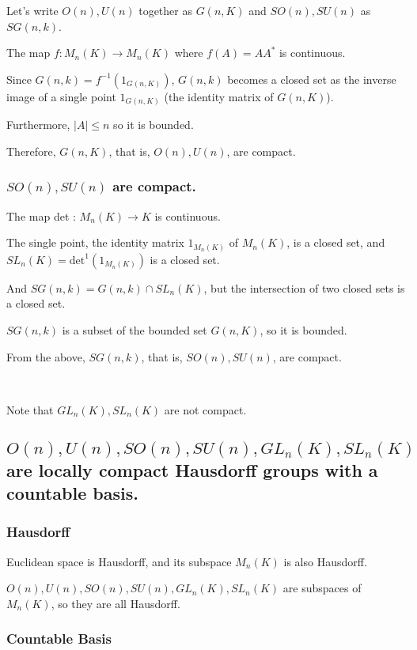 \documentclass[uplatex,a4j,12pt,dvipdfmx]{jsarticle}
\begin{document}
Let's write $O(n),U(n)$ together as $G(n,K)$ and $SO(n),SU(n)$ as $SG(n,k)$.

The map $f: M_{n}(K) \to M_{n}(K)$ where $f(A) = A A^{*}$ is continuous.

Since $G(n,k) = f^{-1}(1_{G(n,K)})$, $G(n,k)$ becomes a closed set as the inverse image of a single point $1_{G(n,K)}$ (the identity matrix of $G(n,K)$).

Furthermore, $|A| \leq n$ so it is bounded.

Therefore, $G(n,K)$, that is, $O(n),U(n)$, are compact.


\subsubsection{\textbf{$SO(n),SU(n)$ are compact.}}

The map det : $M_{n}(K) \to K$ is continuous.

The single point, the identity matrix $1_{M_{n}(K)}$ of $M_{n}(K)$, is a closed set, and
$SL_{n}(K) = \text{det}^{1}(1_{M_{n}(K)})$ is a closed set.

And $SG(n,k) = G(n,k) \cap SL_{n}(K)$, but the intersection of two closed sets is a closed set.

$SG(n,k)$ is a subset of the bounded set $G(n,K)$, so it is bounded.

From the above, $SG(n,k)$, that is, $SO(n),SU(n)$, are compact.

\ \ 

Note that $GL_{n}(K), SL_{n}(K)$ are not compact.


\subsection{\textbf{$O(n),U(n),SO(n),SU(n),GL_{n}(K),SL_{n}(K)$ are locally compact Hausdorff groups with a countable basis.}}

\subsubsection{\textbf{Hausdorff}}

Euclidean space is Hausdorff, and its subspace $M_{n}(K)$ is also Hausdorff.

$O(n),U(n),SO(n),SU(n),GL_{n}(K),SL_{n}(K)$ are subspaces of $M_{n}(K)$, so they are all Hausdorff.

\subsubsection{\textbf{Countable Basis}}
\end{document}
